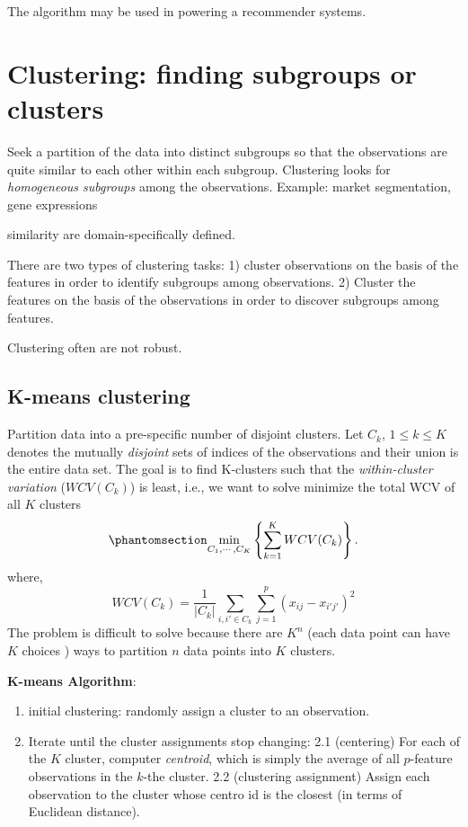 \documentclass[
  letterpaper,
  DIV=11,
  numbers=noendperiod]{scrreprt}
\providecommand{\tightlist}{%
  \setlength{\itemsep}{0pt}\setlength{\parskip}{0pt}}\usepackage{longtable,booktabs,array}
\begin{document}
The algorithm may be used in powering a recommender systems.

\section{Clustering: finding subgroups or
clusters}\label{clustering-finding-subgroups-or-clusters}

Seek a partition of the data into distinct subgroups so that the
observations are quite similar to each other within each subgroup.
Clustering looks for \emph{homogeneous subgroups} among the
observations. Example: market segmentation, gene expressions

similarity are domain-specifically defined.

There are two types of clustering tasks: 1) cluster observations on the
basis of the features in order to identify subgroups among observations.
2) Cluster the features on the basis of the observations in order to
discover subgroups among features.

Clustering often are not robust.

\subsection{K-means clustering}\label{k-means-clustering}

Partition data into a pre-specific number of disjoint clusters. Let
\(C_k\), \(1\le k \le K\) denotes the mutually \emph{disjoint} sets of
indices of the observations and their union is the entire data set. The
goal is to find K-clusters such that the \emph{within-cluster variation}
(\(WCV(C_k)\)) is least, i.e., we want to solve minimize the total WCV
of all \(K\) clusters
\begin{equation}\phantomsection\label{eq-clustering-var}{
\min_{C_1, \cdots, C_K} \left\{ \sum_{k=1}^K WCV(C_k) \right\}.
}\end{equation} where, \[
WCV(C_k)=\frac{1}{|C_k|}\sum_{i,i'\in C_k}\sum_{j=1}^p(x_{ij}-x_{i'j'})^2
\] The problem is difficult to solve because there are \(K^n\) (each
data point can have \(K\) choices ) ways to partition \(n\) data points
into \(K\) clusters.

\textbf{K-means Algorithm}:

\begin{enumerate}
\def\labelenumi{\arabic{enumi}.}
\tightlist
\item
  initial clustering: randomly assign a cluster to an observation.
\item
  Iterate until the cluster assignments stop changing: 2.1 (centering)
  For each of the \(K\) cluster, computer \emph{centroid}, which is
  simply the average of all \(p\)-feature observations in the \(k\)-the
  cluster. 2.2 (clustering assignment) Assign each observation to the
  cluster whose centro id is the closest (in terms of Euclidean
  distance).
\end{enumerate}
\end{document}
